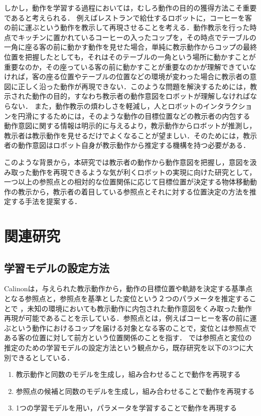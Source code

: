 しかし，動作を学習する過程においては，むしろ動作の目的の獲得方法こそ重要であると考えられる．
例えばレストランで給仕するロボットに，コーヒーを客の前に運ぶという動作を教示して再現させることを考える．動作教示を行った時点でキッチンに置かれているコーヒーの入ったコップを，その時点でテーブルの一角に座る客の前に動かす動作を見せた場合，単純に教示動作からコップの最終位置を把握したとしても，それはそのテーブルの一角という場所に動かすことが重要なのか，その座っている客の前に動かすことが重要なのかが理解できていなければ，客の座る位置やテーブルの位置などの環境が変わった場合に教示者の意図に正しく沿った動作が再現できない．このような問題を解決するためには，教示された動作の目的，すなわち教示者の動作意図をロボットが理解しなければならない．
また，動作教示の煩わしさを軽減し，人とロボットのインタラクションを円滑にするためには，そのような動作の目標位置などの教示者の内包する動作意図に関する情報は明示的に与えるより，教示動作からロボットが推測し，教示者は教示動作を見せるだけでよくなることが望ましい．そのためには，教示者の動作意図はロボット自身が教示動作から推定する機構を持つ必要がある．

このような背景から，本研究では教示者の動作から動作意図を把握し，意図を汲み取った動作を再現できるような気が利くロボットの実現に向けた研究として，一つ以上の参照点との相対的な位置関係に応じて目標位置が決定する物体移動動作の教示から，教示者の着目している参照点とそれに対する位置決定の方法を推定する手法を提案する．

\section{関連研究}

\subsection{学習モデルの設定方法}

Calinon\cite{calinon}は，与えられた教示動作から，動作の目標位置や軌跡を決定する基準点となる参照点と，参照点を基準とした変位という２つのパラメータを推定することで
，未知の環境においても教示動作に内包された動作意図をくみ取った動作再現が可能であることを示している．参照点とは，例えばコーヒーを客の前に運ぶという動作におけるコップを届ける対象となる客のことで，変位とは参照点である客の位置に対して前方という位置関係のことを指す．
\cite{calinon}では参照点と変位の推定のための学習モデルの設定方法という観点から，既存研究を以下の3つに大別できるとしている．

	\begin{enumerate}
		\item 教示動作と同数のモデルを生成し，組み合わせることで動作を再現する
		\item 参照点の候補と同数のモデルを生成し，組み合わせることで動作を再現する
		\item 1つの学習モデルを用い，パラメータを学習することで動作を再現する
	\end{enumerate}
	
